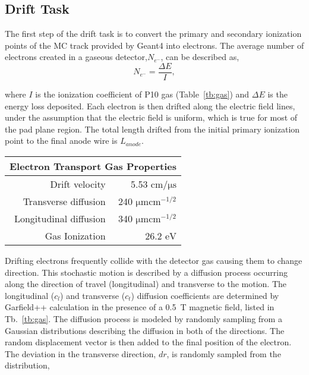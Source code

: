 \subsection{Drift Task}
 
 The first step of the drift task is to convert the primary and secondary ionization points of the MC track provided by Geant4 into electrons. The average number of electrons created in a gaseous detector,$N_{e^-}$, can be described as,
\begin{equation}
N_{e^{-}} =  \frac{\Delta E}{I},
\label{eq:kev2el}
\end{equation}
 
where $I$ is the ionization coefficient of P10 gas (Table~\ref{tb:gas}) and $\Delta E$ is the energy loss deposited. Each electron is then drifted along the electric field lines, under the assumption  that the electric field is uniform, which is true for most of the pad plane region. The total length drifted from the initial primary ionization point to the final anode wire is $L_{anode}$. 

\begin{table*}\centering
{}
\begin{tabular}{@{}rr@{}}\toprule 
\multicolumn{2}{c}{Electron Transport Gas Properties} \\
 \midrule
Drift velocity & 5.53 $\si{\centi\meter\per\micro\second}$\\
Transverse diffusion & 240 $\si{\micro \meter \centi\meter}^{-1/2}$\\
Longitudinal diffusion &  340 $\si{\micro \meter \centi\meter}^{-1/2}$\\
Gas Ionization & 26.2 $\si{\eV}$\\
\bottomrule
\end{tabular}
\caption{An overview of electron drift properties in P10 gas.}
\label{tb:gas}
\end{table*}

Drifting electrons frequently collide with the detector gas causing them to change direction. This stochastic motion is  described by a diffusion process occurring along the direction of travel (longitudinal) and transverse to the motion. The longitudinal ($c_{l}$) and transverse ($c_{t}$) diffusion coefficients are determined by Garfield++ calculation  \cite{garfield++} in the presence of a \SI{0.5}{\tesla} magnetic field, listed in Tb.~\ref{tb:gas}. The diffusion process is modeled by randomly sampling from a Gaussian distributions describing the diffusion in both of the directions. The random displacement vector is then added to the final position of the electron. The deviation in the transverse direction, $dr$, is randomly sampled from the distribution,

